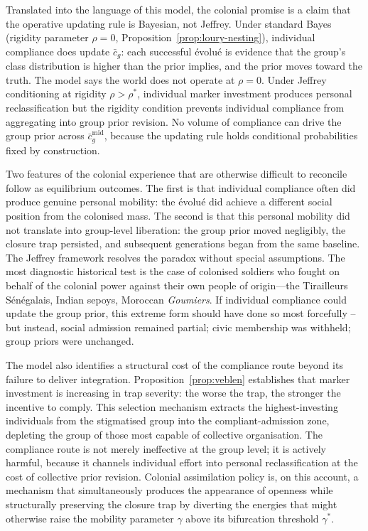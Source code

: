 \documentclass[12pt,a4paper]{article}
\theoremstyle{definition}
\numberwithin{proposition}{subsection}
\begin{document}
Translated into the language of this model, the colonial promise is
a claim that the operative updating rule is Bayesian, not Jeffrey.
Under standard Bayes (rigidity parameter $\rho = 0$,
Proposition~\ref{prop:loury-nesting}), individual compliance does
update $\bar{c}_g$: each successful \'{e}volu\'{e} is evidence that
the group's class distribution is higher than the prior implies, and
the prior moves toward the truth. The model says the world does not
operate at $\rho = 0$. Under Jeffrey conditioning at rigidity
$\rho > \rho^*$, individual marker investment produces personal
reclassification but the rigidity condition prevents individual
compliance from aggregating into group prior revision. No volume of
compliance can drive the group prior across
$\bar{c}_g^{\mathrm{mid}}$, because the updating rule holds
conditional probabilities fixed by construction.

Two features of the colonial experience that are otherwise difficult
to reconcile follow as equilibrium outcomes. The first is that
individual compliance often did produce genuine personal mobility:
the \'{e}volu\'{e} did achieve a different social position from the
colonised mass. The second is that this personal mobility did not
translate into group-level liberation: the group prior moved
negligibly, the closure trap persisted, and subsequent generations
began from the same baseline. The Jeffrey framework resolves the
paradox without special assumptions. The most diagnostic historical
test is the case of colonised soldiers who fought on behalf of the
colonial power against their own people of origin---the Tirailleurs
S\'{e}n\'{e}galais, Indian sepoys, Moroccan \textit{Goumiers}. If
individual compliance could update the group prior, this extreme
form should have done so most forcefully -- but instead, social admission remained partial; civic membership was
withheld; group priors were unchanged.

The model also identifies a structural cost of the compliance route
beyond its failure to deliver integration.
Proposition~\ref{prop:veblen} establishes that marker investment is
increasing in trap severity: the worse the trap, the stronger the
incentive to comply. This selection mechanism extracts the
highest-investing individuals from the stigmatised group into the
compliant-admission zone, depleting the group of those most capable
of collective organisation. The compliance route is not merely
ineffective at the group level; it is actively harmful, because it
channels individual effort into personal reclassification at the
cost of collective prior revision. Colonial assimilation policy is,
on this account, a mechanism that simultaneously produces the
appearance of openness while structurally preserving the closure
trap by diverting the energies that might otherwise raise the
mobility parameter $\gamma$
above its bifurcation threshold $\gamma^*$. 
\end{document}
